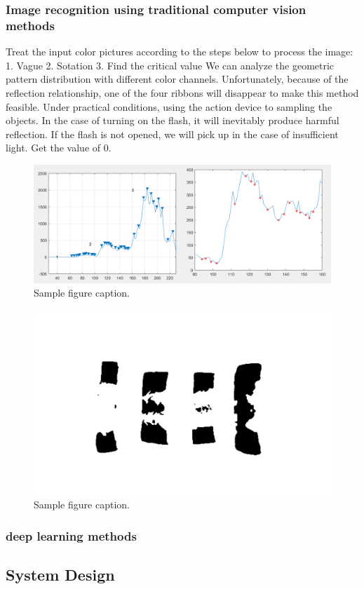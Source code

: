 \documentclass{article}
\begin{document}
\subsubsection{Image recognition using traditional computer vision methods}
Treat the input color pictures according to the steps below to process the image:
1. Vague
2. Sotation
3. Find the critical value
We can analyze the geometric pattern distribution with different color channels. Unfortunately, because of the reflection relationship, one of the four ribbons will disappear to make this method feasible. Under practical conditions, using the action device to sampling the objects. In the case of turning on the flash, it will inevitably produce harmful reflection. If the flash is not opened, we will pick up in the case of insufficient light. Get the value of 0.
\begin{figure}
	\centering
	\includegraphics[width=0.7\linewidth]{tcv0.png}
	\caption{Sample figure caption.}
	\label{fig:tcv0}
\end{figure}
\begin{figure}
	\centering
	\includegraphics[width=0.7\linewidth]{zz9.png}
	\caption{Sample figure caption.}
	\label{fig:zz9}
\end{figure}

\subsubsection{deep learning methods}
\subsection{System Design}
\end{document}
